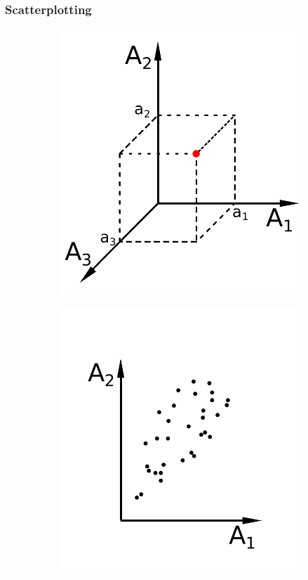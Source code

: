 \documentclass[a4paper,fontsize=12pt,toc=bib,parskip=half,ngerman]{scrartcl}
\begin{document}
\subsubsection{Scatterplotting}
\begin{figure}
	\hspace{2cm}
	\begin{subfigure}{0.30\textwidth}
		\includegraphics[width=\textwidth]{pictures/Scatterplot3D}
		\caption{}
	\end{subfigure}
	\hfill
	\begin{subfigure}{0.30\textwidth}
		\includegraphics[width=\textwidth]{pictures/Scatterplot2D}

\end{subfigure}
\end{figure}
\end{document}
